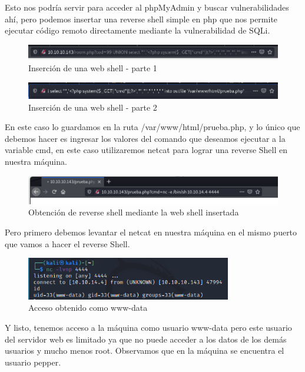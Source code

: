 \documentclass{article}
\begin{document}
Esto nos podría servir para acceder al phpMyAdmin y buscar vulnerabilidades ahí, pero podemos insertar una reverse shell simple en php que nos permite ejecutar código remoto directamente mediante la vulnerabilidad de SQLi.
\begin{figure}[H]
	\center
	\includegraphics[width=\textwidth]{images/jarvis/9.png}
	\caption{Inserción de una web shell - parte 1}
\end{figure}
\begin{figure}[H]
	\center
	\includegraphics[width=\textwidth]{images/jarvis/10.png}
	\caption{Inserción de una web shell - parte 2}
\end{figure}

En este caso lo guardamos en la ruta /var/www/html/prueba.php, y lo único que debemos hacer es ingresar los valores del comando que deseamos ejecutar a la variable cmd, en este caso utilizaremos netcat para lograr una reverse Shell en nuestra máquina.
\begin{figure}[H]
	\center
	\includegraphics[width=\textwidth]{images/jarvis/11.png}
	\caption{Obtención de reverse shell mediante la web shell insertada}
\end{figure}

Pero primero debemos levantar el netcat en nuestra máquina en el mismo puerto que vamos a hacer el reverse Shell.
\begin{figure}[H]
	\center
	\includegraphics[width=0.8\textwidth]{images/jarvis/12.png}
	\caption{Acceso obtenido como www-data}
\end{figure}

Y listo, tenemos acceso a la máquina como usuario www-data pero este usuario del servidor web es limitado ya que no puede acceder a los datos de los demás usuarios y mucho menos root. Observamos que en la máquina se encuentra el usuario pepper.
\end{document}

